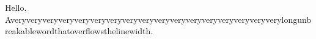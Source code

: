 \documentclass{article}
\begin{document}
Hello.
Averyveryveryveryveryveryveryveryveryveryveryveryveryveryveryveryverylongunbreakablewordthatoverflowsthelinewidth.
\end{document}
